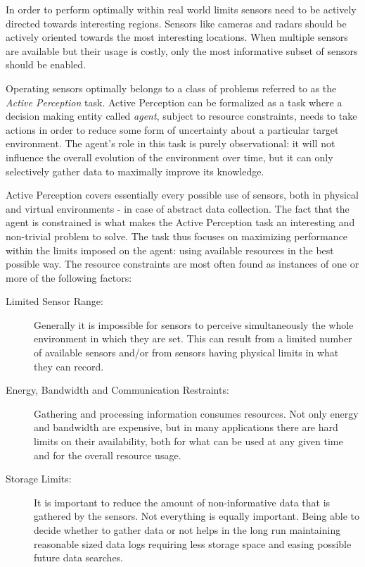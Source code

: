 In order to perform optimally within real world limits sensors need to be actively directed towards
interesting regions. Sensors like cameras and radars should be actively oriented towards the most
interesting locations. When multiple sensors are available but their usage is costly, only the most
informative subset of sensors should be enabled.

Operating sensors optimally belongs to a class of problems referred to as the \textit{Active
Perception} task.  Active Perception can be formalized as a task where a decision making entity
called \textit{agent}, subject to resource constraints, needs to take actions in order to reduce
some form of uncertainty about a particular target environment. The agent's role in this task is
purely observational: it will not influence the overall evolution of the environment over time, but
it can only selectively gather data to maximally improve its knowledge.

Active Perception covers essentially every possible use of sensors, both in physical and virtual
environments - in case of abstract data collection. The fact that the agent is constrained is what
makes the Active Perception task an interesting and non-trivial problem to solve. The task thus
focuses on maximizing performance within the limits imposed on the agent: using available resources
in the best possible way. The resource constraints are most often found as instances of one or more
of the following factors: 

\begin{description}
\item[Limited Sensor Range:] Generally it is impossible for sensors to perceive simultaneously the
    whole environment in which they are set. This can result from a limited number of available sensors
    and/or from sensors having physical limits in what they can record. 
\item[Energy, Bandwidth and Communication Restraints:] Gathering and processing information consumes
    resources. Not only energy and bandwidth are expensive, but in many applications there are hard
    limits on their availability, both for what can be used at any given time and for the overall
    resource usage.
\item[Storage Limits:] It is important to reduce the amount of non-informative data that is gathered
    by the sensors. Not everything is equally important. Being able to decide whether to gather data or
    not helps in the long run maintaining reasonable sized data logs requiring less storage space and
    easing possible future data searches.
\end{description}



